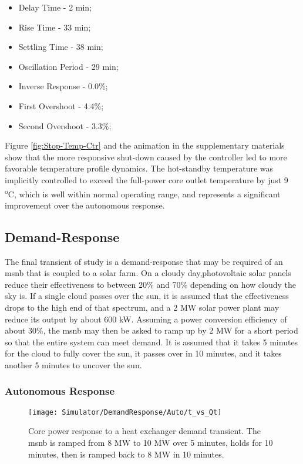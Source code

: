 \begin{itemize}
    \item Delay Time - 2 min;
    \item Rise Time - 33 min;
    \item Settling Time - 38 min;
    \item Oscillation Period - 29 min;
    \item Inverse Response - 0.0\%;
    \item First Overshoot - 4.4\%;
    \item Second Overshoot - 3.3\%;
\end{itemize}

Figure \ref{fig:Stop-Temp-Ctr} and the animation in the supplementary materials show that the more responsive shut-down caused by the controller led to more favorable temperature profile dynamics. The hot-standby temperature was implicitly controlled to exceed the full-power core outlet temperature by just 9 \textsuperscript{o}C, which is well within normal operating range, and represents a significant improvement over the autonomous response.


\subsection{Demand-Response}
The final transient of study is a demand-response that may be required of an \acs{msnb} that is coupled to a solar farm. On a cloudy day,photovoltaic solar panels reduce their effectiveness to between 20\% and 70\% depending on how cloudy the sky is. If a single cloud passes over the sun, it is assumed that the effectiveness drops to the high end of that spectrum, and a 2 MW solar power plant may reduce its output by about 600 kW. Assuming a power conversion efficiency of about 30\%, the \acs{msnb} may then be asked to ramp up by 2 MW for a short period so that the entire system can meet demand.  It is assumed that it takes 5 minutes for the cloud to fully cover the sun, it passes over in 10 minutes, and it takes another 5 minutes to uncover the sun.

\subsubsection{Autonomous Response} 

\begin{figure}[ht!]
    \centering
    \texttt{[image: Simulator/DemandResponse/Auto/t\_vs\_Qt]}
    \caption[Autonomous Demand-Response Power Response]{Core power response to a heat exchanger demand transient. The \acs{msnb} is ramped from 8 MW to 10 MW over 5 minutes, holds for 10 minutes, then is ramped back to 8 MW in 10 minutes.}
    \label{fig:Demand-Power-Auto}
\end{figure}

